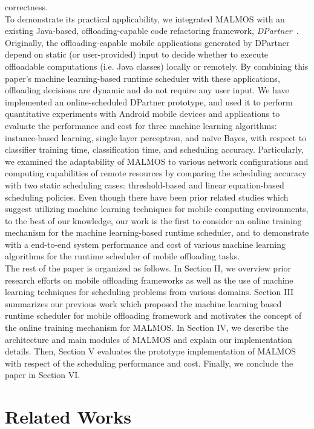 \documentclass[10pt, conference, compsocconf]{IEEEtran}
\begin{document}
correctness.\\
%
\indent To demonstrate its practical applicability, we integrated MALMOS
with an existing Java-based, offloading-capable code refactoring
framework, \textit{DPartner}~\cite{dpartner}.
%
Originally, the offloading-capable mobile applications generated by
DPartner depend on static (or user-provided) input to decide whether to
execute offloadable computations (i.e. Java classes) locally or remotely.
%
By combining this paper's machine learning-based runtime scheduler with
these applications, offloading decisions are dynamic and do not require
any user input.
%
We have implemented an online-scheduled DPartner prototype, and used it
to perform quantitative experiments with Android mobile devices and
applications to evaluate the performance and cost for three machine
learning algorithms: instance-based learning, single layer perceptron, and na\"{i}ve
Bayes, with respect to classifier training time, classification time,
and scheduling accuracy.
%
Particularly, we examined the adaptability of MALMOS to various network
configurations and computing capabilities of remote resources by comparing
the scheduling accuracy with two static scheduling cases:
threshold-based and linear equation-based scheduling policies.
%
Even though there have been prior related studies which suggest
utilizing machine learning techniques for mobile computing environments,
to the best of our knowledge, our work is the first to consider an
online training mechanism for the machine learning-based runtime
scheduler, and to demonstrate with a end-to-end system performance and
cost of various machine learning algorithms for the runtime scheduler of
mobile offloading tasks.\\
%
\indent The rest of the paper is organized as follows.
%
In Section II, we overview prior research efforts on 
mobile offloading frameworks as well as the use of machine
learning techniques for scheduling problems from various domains.
%
Section III summarizes our previous work which proposed the machine
learning based runtime scheduler for mobile offloading framework and
motivates the concept of the online training mechanism for MALMOS. 
%
In Section IV, we describe the architecture and main modules of MALMOS
and explain our implementation details.
%
Then, Section V evaluates the prototype implementation of MALMOS with
respect of the scheduling performance and cost.
%
Finally, we conclude the paper in Section VI.
%
\section{Related Works}
%
\end{document}
